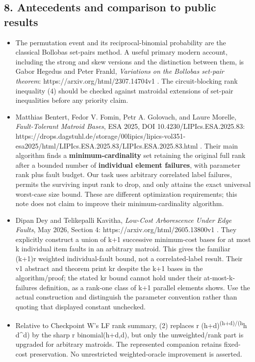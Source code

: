 \hypertarget{af-4c0863a692-antecedents-and-comparison-to-public-results}{%
\subsection{8. Antecedents and comparison to public results}\label{af-4c0863a692-antecedents-and-comparison-to-public-results}}

\begin{itemize}
\item
  The permutation event and its reciprocal-binomial probability are the classical Bollobas set-pairs method. A useful primary modern account, including the strong and skew versions and the distinction between them, is Gabor Hegedus and Peter Frankl, \emph{Variations on the Bollobas set-pair theorem}: https://arxiv.org/html/2307.14704v1 . The circuit-blocking rank inequality (4) should be checked against matroidal extensions of set-pair inequalities before any priority claim.
\item
  Matthias Bentert, Fedor V. Fomin, Petr A. Golovach, and Laure Morelle, \emph{Fault-Tolerant Matroid Bases}, ESA 2025, DOI 10.4230/LIPIcs.ESA.2025.83: https://drops.dagstuhl.de/storage/00lipics/lipics-vol351-esa2025/html/LIPIcs.ESA.2025.83/LIPIcs.ESA.2025.83.html . Their main algorithm finds a \textbf{minimum-cardinality} set retaining the original full rank after a bounded number of \textbf{individual element failures}, with parameter rank plus fault budget. Our task uses arbitrary correlated label failures, permits the surviving input rank to drop, and only attains the exact universal worst-case size bound. These are different optimization requirements; this note does not claim to improve their minimum-cardinality algorithm.
\item
  Dipan Dey and Telikepalli Kavitha, \emph{Low-Cost Arborescence Under Edge Faults}, May 2026, Section 4: https://arxiv.org/html/2605.13800v1 . They explicitly construct a union of k+1 successive minimum-cost bases for at most k individual item faults in an arbitrary matroid. This gives the familiar (k+1)r weighted individual-fault bound, not a correlated-label result. Their v1 abstract and theorem print kr despite the k+1 bases in the algorithm/proof; the stated kr bound cannot hold under their at-most-k-failures definition, as a rank-one class of k+1 parallel elements shows. Use the actual construction and distinguish the parameter convention rather than quoting that displayed constant unchecked.
\item
  Relative to Checkpoint W's LF rank summary, (2) replaces r (h+d)\textsuperscript{(h+d)/(h}h d\^{}d) by the sharp r binomial(h+d,d), but only the unweighted/rank part is upgraded for arbitrary matroids. The represented companion retains fixed-cost preservation. No unrestricted weighted-oracle improvement is asserted.
\end{itemize}

